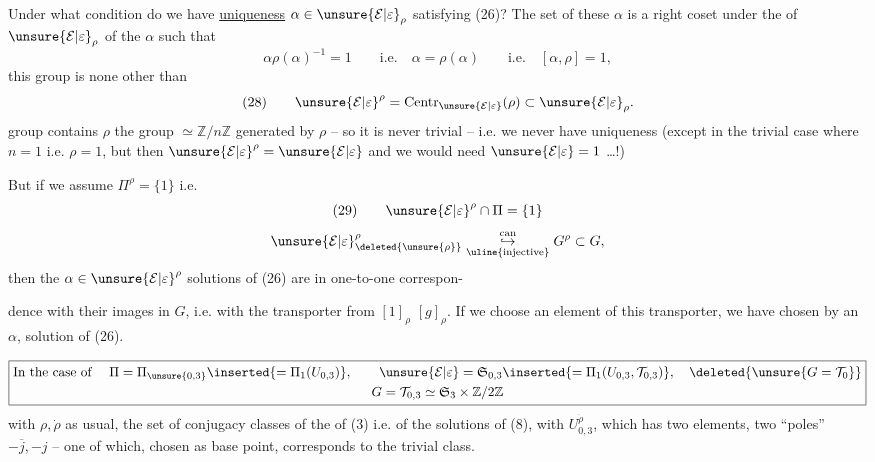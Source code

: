 Under what condition do we have \uline{uniqueness}  $\alpha\in\unsure{\mathcal E|\varepsilon}_\rho$ satisfying (26)?
The set of these $\alpha$ is a right coset under the  of $\unsure{\mathcal E|\varepsilon}_\rho$  of the $\alpha$ such that 
\[
\alpha\rho(\alpha)^{-1}=1\qquad\text{i.e.}\quad
\alpha=\rho(\alpha)\qquad\text{i.e.}\quad[\alpha,\rho]=1,
\]
this group is none other than 
\[
(28)\qquad\unsure{\mathcal E|\varepsilon}^\rho=\operatorname{Centr}_{\unsure{\mathcal E|\varepsilon}}(\rho)\subset\unsure{\mathcal E|\varepsilon}_\rho.
\]
 group contains $\rho$  the group $\simeq\mathbb Z/n\mathbb Z$  generated by $\rho$ -- so it is never trivial -- i.e. we never have uniqueness (except in the trivial case where \deleted{\unsure{$\rho$}} $n=1$ i.e. $\rho=1$,  but then $\unsure{\mathcal E|\varepsilon}^\rho=\unsure{\mathcal E|\varepsilon}$ and we would need $\unsure{\mathcal E|\varepsilon}=1$ \dots !)

But if we assume $\Pi^\rho=\{1\}$ i.e.
\[
(29)\qquad\unsure{\mathcal E|\varepsilon}^\rho\cap\Pi=\{1\}
\]
\[
\unsure{\mathcal E|\varepsilon}^\rho_{\deleted{\unsure{\rho}}}
\underset{\uline{\text{injective}}}{\overset{\mathrm{can}}{\hookrightarrow}}
G^\rho\subset G,
\]
then the $\alpha\in\unsure{\mathcal E|\varepsilon}^\rho$ solutions of (26) are in one-to-one correspon-


dence with their images \inserted{$\dot\alpha$} in $G$, i.e. with the transporter  from $[1]_\rho$  $[g]_\rho$.
If we choose an element of this transporter, we have chosen by  an $\alpha$, solution of (26).

\[
\boxed{\begin{gathered}
\text{In the case of }\quad
\Pi=\Pi_{\unsure{0,3}}\inserted{=\Pi_1(U_{0,3})},\qquad
\unsure{\mathcal E|\varepsilon}=\mathfrak S_{0,3}
\inserted{=\Pi_1(U_{0,3},\mathcal T_{0,3})},
\quad\deleted{\unsure{G=\mathcal T_0}}\\
G=\mathcal T_{0,3}\simeq\mathfrak S_3\times\mathbb Z/2\mathbb Z
\end{gathered}}
\]
with $\rho,\dot\rho$ as usual, the set of conjugacy classes of the  of (3) i.e. of the solutions of (8),  with $U_{0,3}^{\dot\rho}$, which has two elements,  two ``poles'' $-\overline j,-j$ -- one of which, chosen as base point, corresponds to the trivial class.

